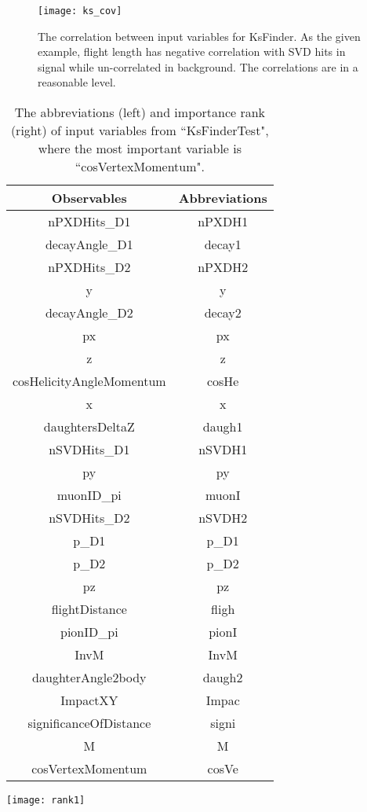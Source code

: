 \begin{figure}[ht]
\centering
\texttt{[image: ks\_cov]}
\caption{The correlation between input variables for KsFinder. As the given example, flight length has negative correlation with SVD hits in signal while un-correlated in background. The correlations are in a reasonable level.}
\label{fig:ks_cov}
\end{figure}

 \begin{table}[htpb]
 	\begin{minipage}[ht]{0.5\linewidth}
 		\centering
 		\begin{tabular}{c|c}
 			\hline
 			Observables &  Abbreviations\\
 			\hline
 			nPXDHits\_D1 &  nPXDH1 \\
 			decayAngle\_D1 & decay1 \\
 			nPXDHits\_D2 & nPXDH2\\
 			y & y \\
 			decayAngle\_D2 & decay2\\
 			px & px\\
 			z & z \\
 			cosHelicityAngleMomentum & cosHe\\
 			x & x \\
 			daughtersDeltaZ & daugh1\\
 			nSVDHits\_D1 & nSVDH1\\
 			py & py\\
 			muonID\_pi & muonI\\
 			nSVDHits\_D2 & nSVDH2\\
 			p\_D1 & p\_D1\\
 			p\_D2 & p\_D2\\
 			pz & pz \\
 			flightDistance & fligh\\
 			pionID\_pi & pionI\\
 			InvM & InvM \\
 			daughterAngle2body & daugh2\\
 			ImpactXY & Impac \\
 			significanceOfDistance & signi \\
 			M & M \\
 			cosVertexMomentum & cosVe \\
 			\hline
 		\end{tabular}
 	\end{minipage}
 	\begin{minipage}[ht]{0.5\linewidth}
 		\centering 
 		\texttt{[image: rank1]}
 	\end{minipage}
 \caption{The abbreviations (left) and importance rank (right) of input variables from ``KsFinderTest", where the most important variable is ``cosVertexMomentum".}
 \label{tab:ks_import}
 \end{table}




